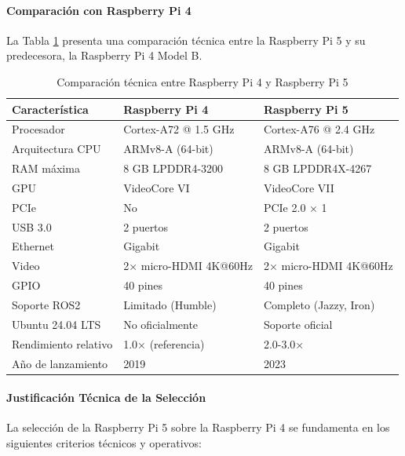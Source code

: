\paragraph{Comparación con Raspberry Pi 4}

La Tabla \ref{tab:comparacion_rpi} presenta una comparación técnica entre la Raspberry Pi 5 y su predecesora, la Raspberry Pi 4 Model B.

\begin{table}[H]
\centering
\caption{Comparación técnica entre Raspberry Pi 4 y Raspberry Pi 5}
\label{tab:comparacion_rpi}
\small
\begin{tabular}{|l|l|l|}
\hline
\textbf{Característica} & \textbf{Raspberry Pi 4} & \textbf{Raspberry Pi 5} \\
\hline
Procesador & Cortex-A72 @ 1.5 GHz & Cortex-A76 @ 2.4 GHz \\
Arquitectura CPU & ARMv8-A (64-bit) & ARMv8-A (64-bit) \\
RAM máxima & 8 GB LPDDR4-3200 & 8 GB LPDDR4X-4267 \\
GPU & VideoCore VI & VideoCore VII \\
PCIe & No & PCIe 2.0 × 1 \\
USB 3.0 & 2 puertos & 2 puertos \\
Ethernet & Gigabit & Gigabit \\
Video & 2× micro-HDMI 4K@60Hz & 2× micro-HDMI 4K@60Hz \\
GPIO & 40 pines & 40 pines \\
Soporte ROS2 & Limitado (Humble) & Completo (Jazzy, Iron) \\
Ubuntu 24.04 LTS & No oficialmente & Soporte oficial \\
Rendimiento relativo & 1.0× (referencia) & 2.0-3.0× \\
Año de lanzamiento & 2019 & 2023 \\
\hline
\end{tabular}
\end{table}

\paragraph{Justificación Técnica de la Selección}

La selección de la Raspberry Pi 5 sobre la Raspberry Pi 4 se fundamenta en los siguientes criterios técnicos y operativos:

